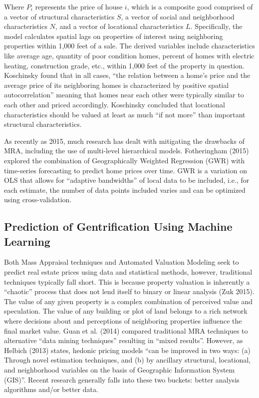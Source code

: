 \documentclass[12pt,]{article}
\begin{document}
Where \(P_i\) represents the price of house \(i\), which is a composite
good comprised of a vector of structural characteristics \(S\), a vector
of social and neighborhood characteristics \(N\), and a vector of
locational characteristics \(L\). Specifically, the model calculates
spatial lags on properties of interest using neighboring properties
within 1,000 feet of a sale. The derived variables include
characteristics like average age, quantity of poor condition homes,
percent of homes with electric heating, construction grade, etc., within
1,000 feet of the property in question. Koschinsky found that in all
cases, ``the relation between a home's price and the average price of
its neighboring homes is characterized by positive spatial
autocorrelation'' meaning that homes near each other were typically
similar to each other and priced accordingly. Koschinsky concluded that
locational characteristics should be valued at least as much ``if not
more'' than important structural characteristics.

As recently as 2015, much research has dealt with mitigating the
drawbacks of MRA, including the use of multi-level hierarchical models.
Fotheringham (2015) explored the combination of Geographically Weighted
Regression (GWR) with time-series forecasting to predict home prices
over time. GWR is a variation on OLS that allows for ``adaptive
bandwidths'' of local data to be included, i.e., for each estimate, the
number of data points included varies and can be optimized using
cross-validation.

\hypertarget{prediction-of-gentrification-using-machine-learning}{%
\subsection{Prediction of Gentrification Using Machine
Learning}\label{prediction-of-gentrification-using-machine-learning}}

Both Mass Appraisal techniques and Automated Valuation Modeling seek to
predict real estate prices using data and statistical methods, however,
traditional techniques typically fall short. This is because property
valuation is inherently a ``chaotic'' process that does not lend itself
to binary or linear analysis (Zuk 2015). The value of any given property
is a complex combination of perceived value and speculation. The value
of any building or plot of land belongs to a rich network where
decisions about and perceptions of neighboring properties influence the
final market value. Guan et al. (2014) compared traditional MRA
techniques to alternative ``data mining techniques'' resulting in
``mixed results''. However, as Helbich (2013) states, hedonic pricing
models ``can be improved in two ways: (a) Through novel estimation
techniques, and (b) by ancillary structural, locational, and
neighborhood variables on the basis of Geographic Information System
(GIS)''. Recent research generally falls into these two buckets: better
analysis algorithms and/or better data.
\end{document}
